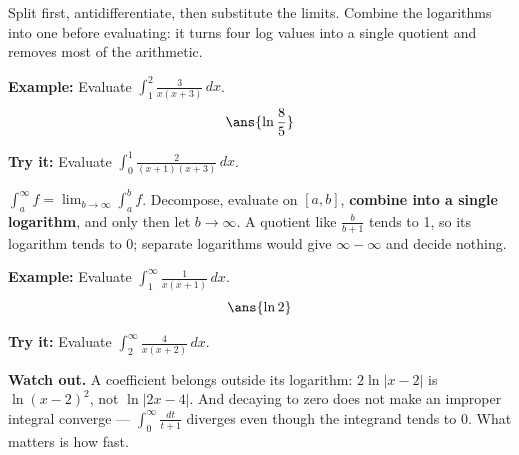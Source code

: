 \documentclass[12pt]{article}
\begin{document}
\begin{formulabox}
Split first, antidifferentiate, then substitute the limits. Combine the
logarithms into one before evaluating: it turns four log values into a single
quotient and removes most of the arithmetic.
\end{formulabox}

\begin{examplebox}
\textbf{Example:} Evaluate $\displaystyle\int_{1}^{2} \frac{3}{x(x+3)}\,dx$.
\[ \ans{\ln\frac{8}{5}} \]
\end{examplebox}

\begin{tryitbox}
\textbf{Try it:} Evaluate $\displaystyle\int_{0}^{1}
\frac{2}{(x+1)(x+3)}\,dx$.

\end{tryitbox}


\begin{formulabox}
$\int_{a}^{\infty} f = \lim_{b\to\infty}\int_{a}^{b} f$. Decompose, evaluate on
$[a, b]$, \textbf{combine into a single logarithm}, and only then let
$b \to \infty$. A quotient like $\frac{b}{b+1}$ tends to 1, so its logarithm
tends to 0; separate logarithms would give $\infty - \infty$ and decide nothing.
\end{formulabox}

\begin{examplebox}
\textbf{Example:} Evaluate $\displaystyle\int_{1}^{\infty}
\frac{1}{x(x+1)}\,dx$.
\[ \ans{\ln 2} \]
\end{examplebox}

\begin{tryitbox}
\textbf{Try it:} Evaluate $\displaystyle\int_{2}^{\infty}
\frac{4}{x(x+2)}\,dx$.

\end{tryitbox}

\begin{watchoutbox}
\textbf{Watch out.} A coefficient belongs outside its logarithm:
$2\ln|x-2|$ is $\ln(x-2)^2$, not $\ln|2x-4|$. And decaying to zero does not make
an improper integral converge --- $\int_{0}^{\infty}\frac{dt}{t+1}$ diverges
even though the integrand tends to 0. What matters is how fast.
\end{watchoutbox}
\end{document}

